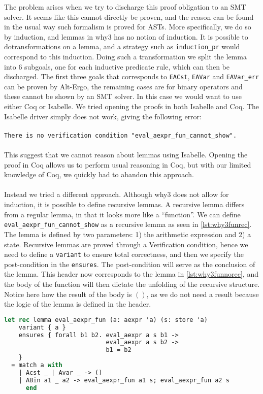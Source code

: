 The problem arises when we try to discharge this proof obligation to an SMT solver.
It seems like this cannot directly be proven, and the reason can be found in the usual way such formalism is proved for ASTs.
More specifically, we do so by induction, and lemmas in why3 has no notion of induction.
It is possible to dotransformations on a lemma, and a strategy such as \texttt{induction_pr} would correspond to this induction.
Doing such a transformation we split the lemma into 6 subgoals, one for each inductive predicate rule, which can then be discharged.
The first three goals that corresponds to \texttt{EACst}, \texttt{EAVar} and \texttt{EAVar\_err} can be proven by Alt-Ergo, the remaining cases are for binary operators and these cannot be shown by an SMT solver.
In this case we would want to use either Coq or Isabelle. We tried opening the proofs in both Isabelle and Coq.
The Isabelle driver simply does not work, giving the following error:
\\~\\
\texttt{There is no verification condition "eval\_aexpr\_fun\_cannot\_show".}
\\~\\
This suggest that we cannot reason about lemmas using Isabelle.
Opening the proof in Coq allows us to perform usual reasoning in Coq, but with our limited knowledge of Coq, we quickly had to abandon this approach.
\\~\\
Instead we tried a different approach. Although why3 does not allow for induction, it is possible to define
recursive lemmas. A recursive lemma differs from a regular lemma, in that it looks more like a ``function''.
We can define \texttt{eval_aexpr_fun_cannot_show} as a recursive lemma as seen in \autoref{lst:why3funrec}.
The lemma is defined by two parameters: 1) the arithmetic expression and 2) a state.
Recursive lemmas are proved through a Verification condition,
hence we need to define a \texttt{variant} to ensure total correctness,
and then we specify the post-condition in the \texttt{ensures}.
The post-condition will serve as the conclusion of the lemma.
This header now corresponds to the lemma in \autoref{lst:why3funnorec}, and the body of the function will then dictate the unfolding of the recursive structure.
Notice here how the result of the body is $()$, as we do not need a result because the logic
of the lemma is defined in the header.

\begin{lstlisting}[caption={Recursive lemma for functional arithmetic expressions},label={lst:why3funrec},language=sml]
let rec lemma eval_aexpr_fun (a: aexpr 'a) (s: store 'a)
    variant { a }
    ensures { forall b1 b2. eval_aexpr a s b1 ->
                            eval_aexpr a s b2 ->
                            b1 = b2
    }
  = match a with
    | Acst _ | Avar _ -> ()
    | ABin a1 _ a2 -> eval_aexpr_fun a1 s; eval_aexpr_fun a2 s
      end
\end{lstlisting}

